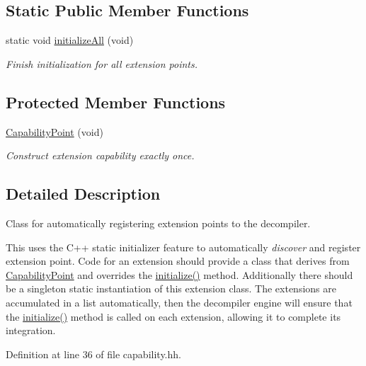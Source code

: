 \subsection*{Static Public Member Functions}
\begin{DoxyCompactItemize}
\item 
static void \mbox{\hyperlink{class_capability_point_a4ea216194d3e4cb1f0994dfcbd653a45}{initialize\+All}} (void)
\begin{DoxyCompactList}\small\item\em Finish initialization for all extension points. \end{DoxyCompactList}\end{DoxyCompactItemize}
\subsection*{Protected Member Functions}
\begin{DoxyCompactItemize}
\item 
\mbox{\hyperlink{class_capability_point_aeab7831942fb111df63c8ddacafa0c11}{Capability\+Point}} (void)
\begin{DoxyCompactList}\small\item\em Construct extension capability exactly once. \end{DoxyCompactList}\end{DoxyCompactItemize}


\subsection{Detailed Description}
Class for automatically registering extension points to the decompiler. 

This uses the C++ static initializer feature to automatically {\itshape discover} and register extension point. Code for an extension should provide a class that derives from \mbox{\hyperlink{class_capability_point}{Capability\+Point}} and overrides the \mbox{\hyperlink{class_capability_point_a493d24125e7e024a9b2d6c2ad4bfbfab}{initialize()}} method. Additionally there should be a singleton static instantiation of this extension class. The extensions are accumulated in a list automatically, then the decompiler engine will ensure that the \mbox{\hyperlink{class_capability_point_a493d24125e7e024a9b2d6c2ad4bfbfab}{initialize()}} method is called on each extension, allowing it to complete its integration. 

Definition at line 36 of file capability.\+hh.



